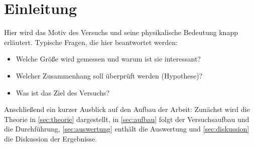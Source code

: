 \section{Einleitung}
\label{sec:einleitung}

Hier wird das Motiv des Versuchs und seine physikalische Bedeutung knapp
erläutert. Typische Fragen, die hier beantwortet werden:
\begin{itemize}
  \item Welche Größe wird gemessen und warum ist sie interessant?
  \item Welcher Zusammenhang soll überprüft werden (Hypothese)?
  \item Was ist das Ziel des Versuchs?
\end{itemize}

Anschließend ein kurzer Ausblick auf den Aufbau der Arbeit: Zunächst wird
die Theorie in \cref{sec:theorie} dargestellt, in \cref{sec:aufbau} folgt der
Versuchsaufbau und die Durchführung, \cref{sec:auswertung} enthält die
Auswertung und \cref{sec:diskussion} die Diskussion der Ergebnisse.
